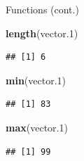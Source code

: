 \documentclass[ignorenonframetext,]{beamer}
\newenvironment{Shaded}{\begin{snugshade}}{\end{snugshade}}
\newcommand{\KeywordTok}[1]{\textcolor[rgb]{0.13,0.29,0.53}{\textbf{#1}}}
\newcommand{\DecValTok}[1]{\textcolor[rgb]{0.00,0.00,0.81}{#1}}
\newcommand{\NormalTok}[1]{#1}
\begin{document}
\begin{frame}[fragile]{Functions (cont.)}

\begin{Shaded}
\begin{Highlighting}[]
\KeywordTok{length}\NormalTok{(vector.}\DecValTok{1}\NormalTok{)}
\end{Highlighting}
\end{Shaded}

\begin{verbatim}
## [1] 6
\end{verbatim}

\begin{Shaded}
\begin{Highlighting}[]
\KeywordTok{min}\NormalTok{(vector.}\DecValTok{1}\NormalTok{)}
\end{Highlighting}
\end{Shaded}

\begin{verbatim}
## [1] 83
\end{verbatim}

\begin{Shaded}
\begin{Highlighting}[]
\KeywordTok{max}\NormalTok{(vector.}\DecValTok{1}\NormalTok{)}
\end{Highlighting}
\end{Shaded}

\begin{verbatim}
## [1] 99
\end{verbatim}

\end{frame}
\end{document}
